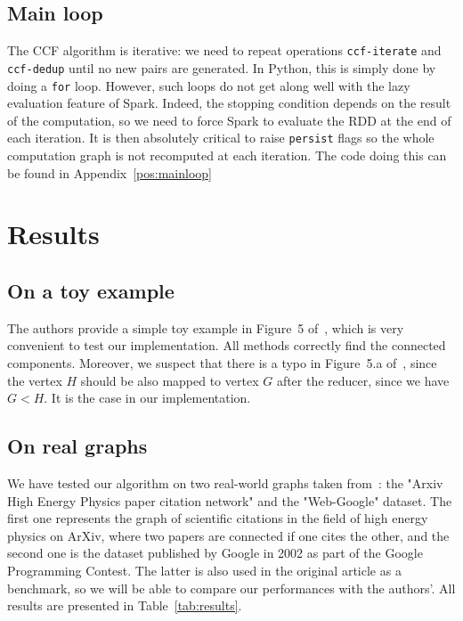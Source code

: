 \documentclass[a4paper,12pt]{article}
\begin{document}
\subsection{Main loop}
The CCF algorithm is iterative: we need to repeat operations \verb|ccf-iterate| and \verb|ccf-dedup| until no new pairs are generated. In Python, this is simply done by doing a \verb|for| loop. However, such loops do not get along well with the lazy evaluation feature of Spark. Indeed, the stopping condition depends on the result of the computation, so we need to force Spark to evaluate the RDD at the end of each iteration. It is then absolutely critical to raise \verb|persist| flags so the whole computation graph is not recomputed at each iteration. The code doing this can be found in Appendix~\ref{pos:mainloop}

\section{Results}
\label{pos:results}
\subsection{On a toy example}
The authors provide a simple toy example in Figure~5 of~\cite{kardes2014ccf}, which is very convenient to test our implementation. All methods correctly find the connected components. Moreover, we suspect that there is a typo in Figure~5.a of~\cite{kardes2014ccf}, since the vertex $H$ should be also mapped to vertex $G$ after the reducer, since we have $G<H$. It is the case in our implementation.

\subsection{On real graphs}
We have tested our algorithm on two real-world graphs taken from~\cite{snapnets}: the "Arxiv High Energy Physics paper citation network" and the "Web-Google" dataset. The first one represents the graph of scientific citations in the field of high energy physics on ArXiv, where two papers are connected if one cites the other, and the second one is the dataset published by Google in 2002 as part of the Google Programming Contest. The latter is also used in the original article as a benchmark, so we will be able to compare our performances with the authors'. All results are presented in Table~\ref{tab:results}.
\end{document}
